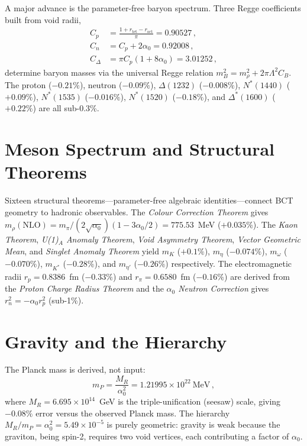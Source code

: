\documentclass[aps,prl,reprint,superscriptaddress,showpacs]{revtex4-2}
\begin{document}
A major advance is the parameter-free baryon spectrum.
Three Regge coefficients built from void radii,
\begin{align}
  C_p &= \frac{1 + r_{\mathrm{tet}} - r_{\mathrm{oct}}}{\pi} = 0.90527\,, \\
  C_n &= C_p + 2\alpha_0 = 0.92008\,, \\
  C_\Delta &= \pi C_p(1 + 8\alpha_0) = 3.01252\,,
\end{align}
determine baryon masses via the universal Regge relation
$m_B^2 = m_\rho^2 + 2\pi\Lambda^2 C_B$.
The proton ($-0.21\%$), neutron ($-0.09\%$),
$\Delta(1232)$ ($-0.008\%$), $N^*(1440)$ ($+0.09\%$),
$N^*(1535)$ ($-0.016\%$), $N^*(1520)$ ($-0.18\%$),
and $\Delta^*(1600)$ ($+0.22\%$)
are all sub-0.3\%.

\section{Meson Spectrum and Structural Theorems}

Sixteen structural theorems---parameter-free algebraic identities---connect
BCT geometry to hadronic observables. The \emph{Colour Correction Theorem}
gives $m_\rho(\mathrm{NLO}) = m_\pi/(2\sqrt{\alpha_0})(1-3\alpha_0/2)
= 775.53$~MeV ($+0.035\%$).
The \emph{Kaon Theorem}, \emph{U(1)$_A$ Anomaly Theorem},
\emph{Void Asymmetry Theorem}, \emph{Vector Geometric Mean},
and \emph{Singlet Anomaly Theorem} yield
$m_K$ ($+0.1\%$),
$m_\eta$ ($-0.074\%$),
$m_\omega$ ($-0.070\%$),
$m_{K^*}$ ($-0.28\%$),
and $m_{\eta'}$ ($-0.26\%$) respectively.
The electromagnetic radii
$r_p = 0.8386$~fm ($-0.33\%$) and
$r_\pi = 0.6580$~fm ($-0.16\%$) are derived from the
\emph{Proton Charge Radius Theorem} and the \emph{$\alpha_0$ Neutron
Correction} gives $r_n^2 = -\alpha_0 r_p^2$ (sub-1\%).

\section{Gravity and the Hierarchy}

The Planck mass is derived, not input:
\begin{equation}
  m_P = \frac{M_R}{\alpha_0^2} = 1.21995 \times 10^{22}~\mathrm{MeV}\,,
  \label{eq:planck}
\end{equation}
where $M_R = 6.695 \times 10^{14}$~GeV is the triple-unification (seesaw)
scale, giving $-0.08\%$ error versus the observed Planck mass.
The hierarchy $M_R/m_P = \alpha_0^2 = 5.49 \times 10^{-5}$ is purely
geometric: gravity is weak because the graviton, being spin-2, requires
two void vertices, each contributing a factor of $\alpha_0$.
\end{document}
